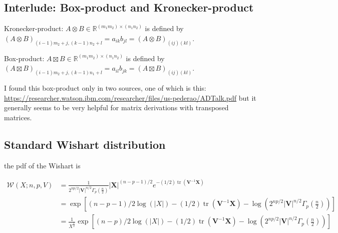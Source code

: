 \makeatletter
\newcommand{\superimpose}[2]{%
	{\ooalign{$#1\@firstoftwo#2$\cr\hfil$#1\@secondoftwo#2$\hfil\cr}}}
\makeatother
\newcommand{\ostimes}{\circledast}
\renewcommand{\ostimes}{\mathpalette\superimpose{{\otimes}{\ominus}}}
\newcommand{\oatimes}{\circledast}
\renewcommand{\oatimes}{\mathpalette\superimpose{{\otimes}{\varobar}}}

\subsection{Interlude: Box-product and Kronecker-product}

Kronecker-product: $A \otimes B \in \mathbb{R}^{(m_1m_2) \times (n_1n_2)}$ is defined by $(A \otimes B)_{(i - 1)m_2+j,(k - 1)n_2+l} = a_{ik}b_{jl} = (A \otimes B)_{(ij)(kl)}$.

Box-product: $A \boxtimes B \in \mathbb{R}^{(m_1m_2) \times (n_1n_2)}$ is defined by $(A \boxtimes B)_{(i - 1)m_2+j,(k - 1)n_1+l} = a_{il}b_{jk} = (A \boxtimes B)_{(ij)(kl)}$.

I found this box-product only in two sources, one of which is this: \url{https://researcher.watson.ibm.com/researcher/files/us-pederao/ADTalk.pdf} but it generally seems to be very helpful for matrix derivations with transposed matrices.

\subsection{Standard Wishart distribution}

the pdf of the Wishart is

\begin{subequations}
\begin{align}
\mathcal{W}(X; n,p,V) &= \frac{1}{2^{np/2} \left|{\mathbf V}\right|^{n/2} \Gamma_p\left(\frac {n}{2}\right ) }{\left|\mathbf{X}\right|}^{(n-p-1)/2} e^{-(1/2)\operatorname{tr}({\mathbf V}^{-1}\mathbf{X})} \\
&= \exp \left[(n-p-1)/2 \log(|X|) -(1/2)\operatorname{tr}({\mathbf V}^{-1}\mathbf{X}) - \log\left(2^{np/2} \left|{\mathbf V}\right|^{n/2} \Gamma_p\left(\frac {n}{2}\right )\right) \right]\\
&= \frac{1}{X^{\frac{1}{2}}}\exp \left[(n-p)/2 \log(|X|) -(1/2)\operatorname{tr}({\mathbf V}^{-1}\mathbf{X}) - \log\left(2^{np/2} \left|{\mathbf V}\right|^{n/2} \Gamma_p\left(\frac {n}{2}\right )\right) \right]
\end{align}
\end{subequations}

